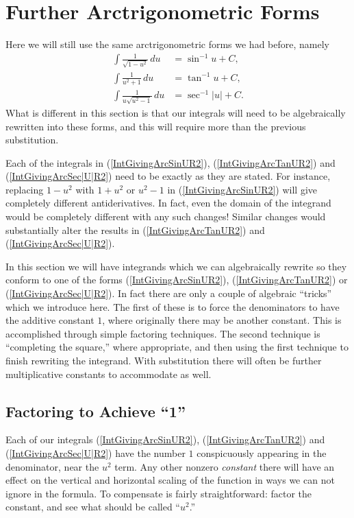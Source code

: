 \newpage
\section{Further Arctrigonometric Forms}

Here we will still use the same arctrigonometric forms
we had before, namely
\begin{align}
\int\frac1{\sqrt{1-u^2}}\,du&=\sin^{-1}u+C,\label{IntGivingArcSinUR2}\\
\int\frac1{u^2+1}\,du&=\tan^{-1}u+C,\label{IntGivingArcTanUR2}\\
\int\frac1{u\sqrt{u^2-1}}\,du&=\sec^{-1}|u|+C.\label{IntGivingArcSec|U|R2}
\end{align}
What is different in this section is that our integrals will
need to be algebraically rewritten into these forms, and this will
require more than the previous substitution.

Each of the integrals in (\ref{IntGivingArcSinUR2}), 
(\ref{IntGivingArcTanUR2}) and (\ref{IntGivingArcSec|U|R2})
need to be exactly as they are stated.  For instance, replacing
$1-u^2$ with $1+u^2$ or $u^2-1$ in  (\ref{IntGivingArcSinUR2})
will give completely different antiderivatives.  In fact, even
the domain of the integrand would be completely different
with any such changes!  Similar changes would substantially alter
the results in
(\ref{IntGivingArcTanUR2}) and (\ref{IntGivingArcSec|U|R2}).

In this section we will have integrands which we can algebraically
rewrite so they conform to one of the forms (\ref{IntGivingArcSinUR2}), 
(\ref{IntGivingArcTanUR2}) or (\ref{IntGivingArcSec|U|R2}).
In fact there are only a couple of algebraic ``tricks'' which we
introduce here.  The first of these is to force the denominators
to have the additive constant $1$, where originally there may
be another constant.  This is accomplished through simple factoring
techniques.  The second technique is ``completing the square,''
where appropriate, and then using the first technique to 
finish rewriting the integrand.  With substitution there will
often be further multiplicative constants to accommodate as well.

\subsection{Factoring to Achieve ``1''}
Each of our integrals (\ref{IntGivingArcSinUR2}), 
(\ref{IntGivingArcTanUR2}) and (\ref{IntGivingArcSec|U|R2})
have the number $1$ conspicuously appearing in the denominator,
near the $u^2$ term.  Any other nonzero {\it constant} there
will have an effect on the vertical and horizontal scaling
of the function in ways we can not ignore in the formula.
To compensate is fairly straightforward: factor the constant,
and see what should be called ``$u^2$.''


